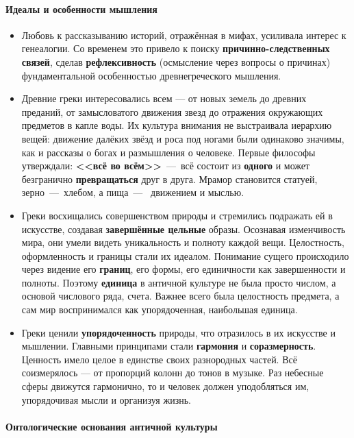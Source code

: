 \paragraph{Идеалы и особенности мышления}

\begin{itemize}
    \item Любовь к рассказыванию историй, отражённая в мифах, усиливала интерес к генеалогии. Со временем это привело к поиску \textbf{причинно-следственных связей}, сделав \textbf{рефлексивность} (осмысление через вопросы о причинах) фундаментальной особенностью древнегреческого мышления.
    \item Древние греки интересовались всем — от новых земель до древних преданий, от замысловатого движения звезд до отражения окружающих предметов в капле воды. Их культура внимания не выстраивала иерархию вещей: движение далёких звёзд и роса под ногами были одинаково значимы, как и рассказы о богах и размышления о человеке. Первые философы утверждали: \textbf{<<всё во всём>>}~---~всё состоит из \textbf{одного} и может безгранично \textbf{превращаться} друг в друга. Мрамор становится статуей, зерно~---~хлебом, а пища~---~ движением и мыслью.
    \item Греки восхищались совершенством природы и стремились подражать ей в искусстве, создавая \textbf{завершённые цельные} образы. Осознавая изменчивость мира, они умели видеть уникальность и полноту каждой вещи. Целостность, оформленность и границы стали их идеалом. Понимание сущего происходило через видение его \textbf{границ}, его формы, его единичности как завершенности и полноты. Поэтому \textbf{единица} в античной культуре не была просто числом, а основой числового ряда, счета. Важнее всего была целостность предмета, а сам мир воспринимался как упорядоченная, наибольшая единица.
    \item Греки ценили \textbf{упорядоченность} природы, что отразилось в их искусстве и мышлении. Главными принципами стали \textbf{гармония} и \textbf{соразмерность}. Ценность имело целое в единстве своих разнородных частей. Всё соизмерялось — от пропорций колонн до тонов в музыке. Раз небесные сферы движутся гармонично, то и человек должен уподобляться им, упорядочивая мысли и организуя жизнь.
\end{itemize}


\paragraph{Онтологические основания античной культуры}

